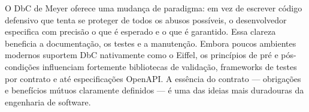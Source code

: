 \documentclass[12pt,a4paper]{article}
\begin{document}
O DbC de Meyer oferece uma mudan\c{c}a de paradigma: em vez de escrever c\'odigo
defensivo que tenta se proteger de todos os abusos poss\'iveis, o desenvolvedor
especifica com precis\~ao o que \'e esperado e o que \'e garantido. Essa clareza
beneficia a documenta\c{c}\~ao, os testes e a manuten\c{c}\~ao. Embora poucos
ambientes modernos suportem DbC nativamente como o Eiffel, os princ\'ipios de
pr\'e e p\'os-condi\c{c}\~oes influenciam fortemente bibliotecas de valida\c{c}\~ao,
frameworks de testes por contrato e at\'e especifica\c{c}\~oes OpenAPI. A ess\^encia
do contrato --- obriga\c{c}\~oes e benef\'icios m\'utuos claramente definidos ---
\'e uma das ideias mais duradouras da engenharia de software.
\end{document}
